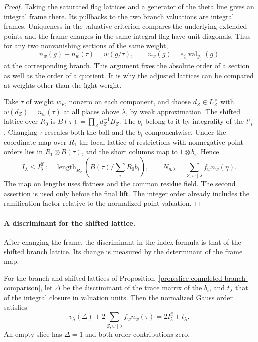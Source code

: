 \begin{proof}
Taking the saturated
flag lattices and a generator of the theta line gives an
integral frame there. Its pullbacks to the two branch
valuations are integral frames. Uniqueness in the valuative
criterion compares the underlying extended points and
the frame changes in the same integral flag have unit
diagonals. Thus for any two nonvanishing sections of the
same weight,
\[
 n_w(g)-n_w(\tau)=w(g/\tau),\qquad
 n_w(g)=e_\zeta\operatorname{val}_{y_\zeta}(g)
\]
at the corresponding branch. This argument fixes the
absolute order of a section as well as the order of a
quotient. It is why the adjusted lattices can be compared
at weights other than the light weight.
\label{cor:slice-orders-2}

Take \(\tau\) of weight \(w_F\), nonzero on each component,
and choose \(d_Z\in L_Z^\times\) with
\(w(d_Z)=n_w(\tau)\) at all places above \(\lambda\),
by weak approximation. The shifted lattice over \(R_0\)
is \(B(\tau)=\prod_Z d_Z^{-1}B_Z\).
The \(b_i\) belong to it by integrality of the \(t'_i\).
Changing \(\tau\) rescales both the ball and the \(b_i\)
componentwise. Under the coordinate map over \(R_1\)
the local lattice of restrictions with nonnegative point
orders lies in \(R_1\otimes B(\tau)\), and the short
columns map to \(1\otimes b_i\). Hence
\begin{equation}\label{eq:slice-order-comparison}
 I_\lambda\le I^{\mathrm{ff}}_\lambda
 :=\operatorname{length}_{R_0}
       (B(\tau)/\textstyle\sum_i R_0 b_i),\qquad
 N_{\eta,\lambda}=\sum_{Z,w\mid\lambda} f_w n_w(\eta).
\end{equation}
The map on lengths uses flatness and the common residue
field. The second assertion is used only before the final
lift. The integer order already includes the ramification
factor relative to the normalized point valuation.

\end{proof}

\paragraph{A discriminant for the shifted lattice.}

After changing the frame, the discriminant in the index formula is that of the shifted branch lattice. Its change is measured by the determinant of the frame map.

\begin{lemma}\label{lem:shifted-slice-discriminant}
For the branch and shifted lattices of
Proposition~\ref{prop:slice-completed-branch-comparison},
let \(\Delta\) be the discriminant of the trace matrix of the
\(b_i\), and \(t_\lambda\) that of the integral closure in
valuation units. Then the normalized Gauss order satisfies
\[
 v_\lambda(\Delta)+2\sum_{Z,w\mid\lambda}f_w n_w(\tau)
                  =2I_\lambda^{\mathrm{ff}}+t_\lambda .
\]
An empty slice has \(\Delta=1\) and both order contributions
zero.
\end{lemma}

